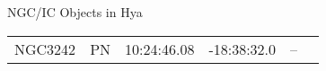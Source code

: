 \begin{block}{NGC/IC Objects in Hya}
  \centering
  \begin{tabularx}{\textwidth}{llrrll} \toprule 
    NGC3242 & PN & 10:24:46.08 & -18:38:32.0  & -- \\ 
  \end{tabularx}
\end{block}